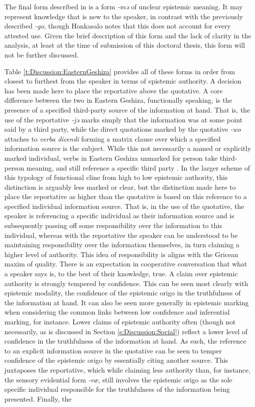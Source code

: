 The final form described in  is a form \textit{-mə} of unclear epistemic meaning. It may represent knowledge that is new to the speaker, in contrast with the previously described \textit{-go}, though Honkasalo notes that this does not account for every attested use. Given the brief description of this form and the lack of clarity in the analysis, at least at the time of submission of this doctoral thesis, this form will not be further discussed.

Table \ref{t:Discussion:EasternGeshiza} provides all of these forms in order from closest to furthest from the speaker in terms of epistemic authority. A decision has been made here to place the reportative above the quotative. A core difference between the two in Eastern Geshiza, functionally speaking, is the presence of a specified third-party source of the information at hand. That is, the use of the reportative \textit{-jə} marks simply that the information was at some point said by a third party, while the direct quotations marked by the quotative \textit{-wo} attaches to \textit{verba dicendi} forming a matrix clause over which a specified information source is the subject. While this not necessarily a named or explicitly marked individual, verbs in Eastern Geshiza unmarked for person take third-person meaning, and still reference a specific third party \cite[592]{Honkasalo2019}. In the larger scheme of this typology of functional cline from high to low epistemic authority, this distinction is arguably less marked or clear, but the distinction made here to place the reportative as higher than the quotative is based on this reference to a specified individual information source. That is, in the use of the quotative, the speaker is referencing a specific individual as their information source and is subsequently passing off some responsibility over the information to this individual, whereas with the reportative the speaker can be understood to be maintaining responsibility over the information themselves, in turn claiming a higher level of authority. This idea of responsibility is aligns with the Gricean maxim of quality. There is an expectation in cooperative conversation that what a speaker says is, to the best of their knowledge, true. A claim over epistemic authority is strongly tempered by confidence. This can be seen most clearly with epistemic modality, the confidence of the epistemic origo in the truthfulness of the information at hand. It can also be seen more generally in epistemic marking when considering the common links between low confidence and inferential marking, for instance. Lower claims of epistemic authority often (though not necessarily, as is discussed in Section \ref{s:Discussion:Social}) reflect a lower level of confidence in the truthfulness of the information at hand. As such, the reference to an explicit information source in the quotative can be seen to temper confidence of the epistemic origo by essentially citing another source. This juxtaposes the reportative, which while claiming less authority than, for instance, the sensory evidential form \textit{-ræ}, still involves the epistemic origo as the sole specific individual responsible for the truthfulness of the information being presented. Finally, the 